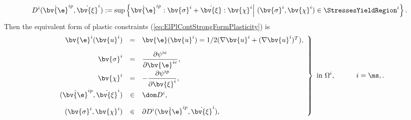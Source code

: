 \begin{equation}
D^i(\dot{\bv{\e}}^{ip},\dot{\bv{\xi}}^i):=\sup\left\lbrace \dot{\bv{\e}}^{ip}: \bv{\sigma}^i+\dot{\bv{\xi}}:\bv{\chi}^i\middle|~(\bv{\sigma}^i,\bv{\chi}^i)\in \StressesYieldRegion^{i}\right\rbrace.
\end{equation}
Then the equivalent form of plastic constraints (\ref{eq:ElPlContStrongFormPlasticity}) is 
\begin{equation}\label{eq:ElPlContStrongFormPlasticityDissipation}
\left. 
   \begin{array}{rcl}
    \bv{\e}^i(\bv{u}^i) &= & \bv{\e}(\bv{u}^i) = 1/2 ( \nabla \bv{u}^i + (\nabla \bv{u}^i)^T ),\\[2ex]
    \bv{\sigma}^i&=&\dfrac{\partial \psi^{ie}}{\partial \bv{\e}^{ie}},\\[2ex]
    \bv{\chi}^i&=&-\dfrac{\partial \psi^{ip}}{\partial \bv{\xi}^i},\\[2ex]
     (\dot{\bv{\e}}^{ip},\dot{\bv{\xi}}^i) &\in& \dom D^{i},\\[2ex]
 (\bv{\sigma}^i,\bv{\chi}^i)&\in& \partial D^{i}(\dot{\bv{\e}}^{ip},\dot{\bv{\xi}}^i),
    \end{array} \right\rbrace \mbox{ in }\Omega^i, \quad \qquad i=\ms,\sl.
\end{equation}

